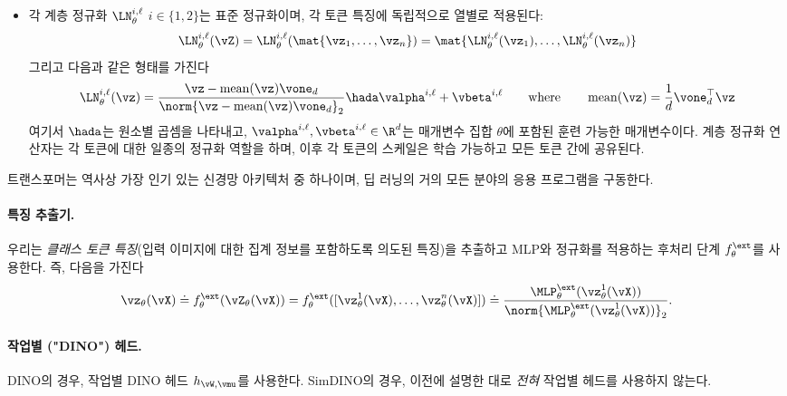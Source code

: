 \documentclass[../../book-main_ko.tex]{subfiles}
\begin{document}
\begin{itemize}
\begin{equation}
    \end{equation}
    여기서 \(\vW_{\up}^{\ell} \in \R^{q \times d}, \vW_{\down}^{\ell} \in \R^{d \times q}, \vb_{\up}^{\ell} \in \R^{q}, \vb_{\down}^{\ell} \in \R^{d}\)는 매개변수 집합 \(\theta\)에 포함된 훈련 가능한 매개변수이고, \(\ReLU\)는 원소별 ReLU 비선형성이다, 즉,  \(\ReLU(\vM)_{ij} = \max\{M_{ij}, 0\}\). 
    \item 각 계층 정규화 \(\LN_{\theta}^{i, \ell}\) \(i \in \{1, 2\}\)는 표준 정규화이며, 각 토큰 특징에 독립적으로 열별로 적용된다:
    \begin{equation}
        \LN_{\theta}^{i, \ell}(\vZ) = \LN_{\theta}^{i, \ell}(\mat{\vz_{1}, \dots, \vz_{n}}) = \mat{\LN_{\theta}^{i, \ell}(\vz_{1}), \dots, \LN_{\theta}^{i, \ell}(\vz_{n})}
    \end{equation}
    그리고 다음과 같은 형태를 가진다
    \begin{equation}
        \LN_{\theta}^{i, \ell}(\vz) = \frac{\vz
        - \operatorname{mean}(\vz)\vone_{d}}{\norm{\vz
        - \operatorname{mean}(\vz)\vone_{d}}_{2}} \hada \valpha^{i, \ell} + \vbeta^{i, \ell} \qquad \text{where} \qquad \operatorname{mean}(\vz) = \frac{1}{d}\vone_{d}^{\top}\vz
    \end{equation}
    여기서 \(\hada\)는 원소별 곱셈을 나타내고, \(\valpha^{i, \ell}, \vbeta^{i, \ell} \in \R^{d}\)는 매개변수 집합 \(\theta\)에 포함된 훈련 가능한 매개변수이다. 계층 정규화 연산자는 각 토큰에 대한 일종의 정규화 역할을 하며, 이후 각 토큰의 스케일은 학습 가능하고 모든 토큰 간에 공유된다.
\end{itemize}

트랜스포머는 역사상 가장 인기 있는 신경망 아키텍처 중 하나이며, 딥 러닝의 거의 모든 분야의 응용 프로그램을 구동한다.

\paragraph{특징 추출기.} 우리는 \textit{클래스 토큰 특징}(입력 이미지에 대한 집계 정보를 포함하도록 의도된 특징)을 추출하고 MLP와 정규화를 적용하는 후처리 단계 \(f_{\theta}^{\ext}\)를 사용한다. 즉, 다음을 가진다
\begin{equation}
    \vz_{\theta}(\vX) \doteq f_{\theta}^{\ext}(\vZ_{\theta}(\vX)) = f_{\theta}^{\ext}( [\vz_{\theta}^{1}(\vX), \dots, \vz_{\theta}^{n}(\vX)]) \doteq \frac{\MLP_{\theta}^{\ext}(\vz_{\theta}^{1}(\vX))}{\norm{\MLP_{\theta}^{\ext}(\vz_{\theta}^{1}(\vX))}_{2}}.
\end{equation}

\paragraph{작업별 ("DINO") 헤드.} DINO의 경우, 작업별 DINO 헤드 \(h_{\vW, \vmu}\)를 사용한다. SimDINO의 경우, 이전에 설명한 대로 \textit{전혀} 작업별 헤드를 사용하지 않는다.
\end{document}
